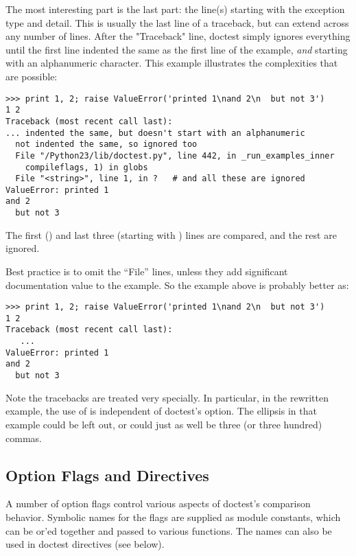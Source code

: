 The most interesting part is the last part:  the line(s) starting with the
exception type and detail.  This is usually the last line of a traceback,
but can extend across any number of lines.  After the "Traceback" line,
doctest simply ignores everything until the first line indented the same as
the first line of the example, \emph{and} starting with an alphanumeric
character.  This example illustrates the complexities that are possible:

\begin{verbatim}
>>> print 1, 2; raise ValueError('printed 1\nand 2\n  but not 3')
1 2
Traceback (most recent call last):
... indented the same, but doesn't start with an alphanumeric
  not indented the same, so ignored too
  File "/Python23/lib/doctest.py", line 442, in _run_examples_inner
    compileflags, 1) in globs
  File "<string>", line 1, in ?   # and all these are ignored
ValueError: printed 1
and 2
  but not 3
\end{verbatim}

The first () and last three (starting with
) lines are compared, and the rest are ignored.

Best practice is to omit the ``File'' lines, unless they add
significant documentation value to the example.  So the example above
is probably better as:

\begin{verbatim}
>>> print 1, 2; raise ValueError('printed 1\nand 2\n  but not 3')
1 2
Traceback (most recent call last):
   ...
ValueError: printed 1
and 2
  but not 3
\end{verbatim}

Note the tracebacks are treated very specially.  In particular, in the
rewritten example, the use of  is independent of doctest's
 option.  The ellipsis in that example could
be left out, or could just as well be three (or three hundred) commas.



\subsection{Option Flags and Directives\label{doctest-options}}

A number of option flags control various aspects of doctest's comparison
behavior.  Symbolic names for the flags are supplied as module constants,
which can be or'ed together and passed to various functions.  The names
can also be used in doctest directives (see below).

